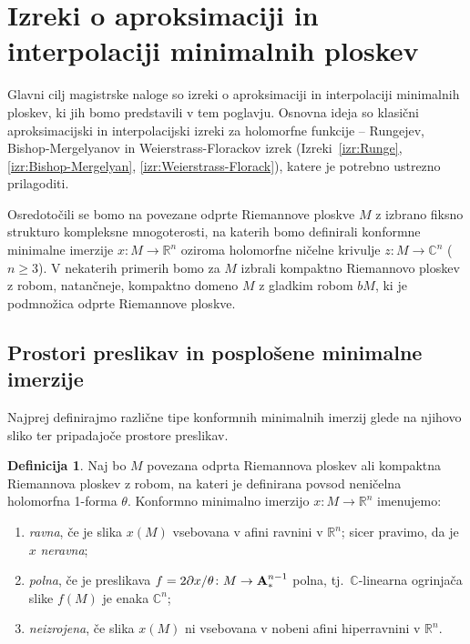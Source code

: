 \documentclass[12pt,a4paper,twoside]{article}
\theoremstyle{definition} %
\newtheorem{definicija}{Definicija}[section]
\theoremstyle{plain} %
\numberwithin{equation}{section}  %
\newcommand{\R}{\mathbb R}
\newcommand{\C}{\mathbb C}
\begin{document}
\section{Izreki o aproksimaciji in interpolaciji minimalnih ploskev}

Glavni cilj magistrske naloge so izreki o aproksimaciji in interpolaciji minimalnih ploskev, ki jih bomo predstavili v tem poglavju. Osnovna ideja so klasični aproksimacijski in interpolacijski izreki za holomorfne funkcije -- Rungejev, Bishop-Mergelyanov in Weierstrass-Florackov izrek (Izreki~\ref{izr:Runge}, \ref{izr:Bishop-Mergelyan}, \ref{izr:Weierstrass-Florack}), katere je potrebno ustrezno prilagoditi.

Osredotočili se bomo na povezane odprte Riemannove ploskve $M$ z izbrano fiksno strukturo kompleksne mnogoterosti, na katerih bomo definirali konformne minimalne imerzije $x \colon M \to \mathbb{R}^{n}$ oziroma holomorfne ničelne krivulje $z \colon M \to \mathbb{C}^{n}$ ($n \geq 3$).
V nekaterih primerih bomo za $M$ izbrali kompaktno Riemannovo ploskev z robom, natančneje, kompaktno domeno $M$ z gladkim robom $bM$, ki je podmnožica odprte Riemannove ploskve.

\subsection{Prostori preslikav in posplošene minimalne imerzije}
%
Najprej definirajmo različne tipe konformnih minimalnih imerzij glede na njihovo sliko ter pripadajoče prostore preslikav.

\begin{definicija} \label{def:full-flat-nd}
Naj bo $M$ povezana odprta Riemannova ploskev ali kompaktna Riemannova ploskev z robom, na kateri je definirana povsod neničelna holomorfna 1-forma $\theta$. Konformno minimalno imerzijo $x \colon M \to \R^{n}$ imenujemo:
\begin{enumerate}
\item \emph{ravna}, če je slika $x(M)$ vsebovana v afini ravnini v $\R^{n}$; sicer pravimo, da je $x$ \emph{neravna};
\item \emph{polna}, če je preslikava $f = 2 \partial{x} / \theta \colon M \to \textbf{\textup{A}}_{*}^{n-1}$ polna, tj.~$\C$-linearna ogrinjača slike $f(M)$ je enaka $\C^{n}$;
\item \emph{neizrojena}, če slika $x(M)$ ni vsebovana v nobeni afini hiperravnini v $\R^{n}$. 
\end{enumerate}
\end{definicija}
\end{document}
